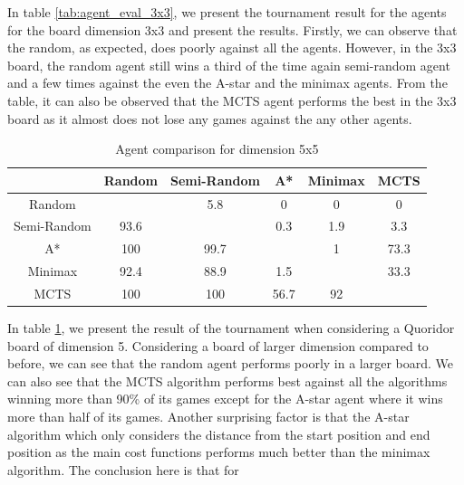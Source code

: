  In table \ref{tab:agent_eval_3x3}, we present the tournament result for the agents for the board dimension 3x3 and present the results. Firstly, we can observe that the random, as expected, does poorly against all the agents. However, in the 3x3 board, the random agent still wins a third of the time again semi-random agent and a few times against the even the A-star and the minimax agents. From the table, it can also be observed that the MCTS agent performs the best in the 3x3 board as it almost does not lose any games against the any other agents.

\begin{table}[!ht]
    \centering
     \begin{tabular}{|c|c|c|c|c|c|}\hline
                & Random & Semi-Random & A*  & Minimax & MCTS \\ \hline 
    Random      &        &    5.8      &  0  &   0     &   0  \\ \hline
    Semi-Random &   93.6 &             & 0.3 &   1.9   &  3.3 \\ \hline
    A*          &   100  &    99.7     &     &   1     & 73.3 \\ \hline
    Minimax     &   92.4 &    88.9     & 1.5 &         & 33.3 \\ \hline
    MCTS        &   100  &    100      & 56.7&   92    &      \\ \hline
     \end{tabular}
     \caption{Agent comparison for dimension 5x5}
     \label{tab:agent_eval_5x5}
 \end{table}

 In table \ref{tab:agent_eval_5x5}, we present the result of the tournament when considering a Quoridor board of dimension 5. Considering a board of larger dimension compared to before, we can see that the random agent performs poorly in a larger board. We can also see that the MCTS algorithm performs best against all the algorithms winning more than 90\% of its games except for the A-star agent where it wins more than half of its games. Another surprising factor is that the A-star algorithm which only considers the distance from the start position and end position as the main cost functions performs much better than the minimax algorithm. The conclusion here is that for 

